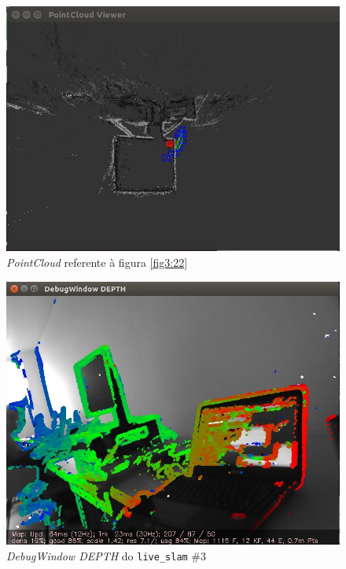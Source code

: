 \begin{figure}[H]
	\centering
		\includegraphics[width= \textwidth]{Imagens/figura3-23.jpg}
	\caption{\textit{PointCloud} referente à figura \ref{fig3:22}}
	\label{fig3:23}
\end{figure}

\begin{figure}[H]
	\centering
		\includegraphics[width= \textwidth]{Imagens/figura3-24.jpg}
	\caption{\textit{DebugWindow DEPTH} do \texttt{live\_slam} \#3}
	\label{fig3:24}
\end{figure}

